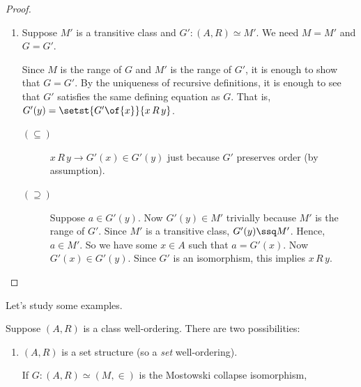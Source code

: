 \begin{proof}
\begin{enumerate}
\begin{itemize}
            \item \underline{Monotonicity.} Suppose $G(x) \in G(y)$. By definition of $G(y)$, there is some $x' \, R \, y$ such that $G(x) = G\of{x'}$. As $G$ is injective, we know that $x = x'$. Thus, $x \, R \, y$.
        \end{itemize}

        \item Suppose $M'$ is a transitive class and $G' : (A, R) \simeq M'$. We need $M = M'$ and $G = G'$.

        Since $M$ is the range of $G$ and $M'$ is the range of $G'$, it is enough to show that $G = G'$. By the uniqueness of recursive definitions, %
        it is enough to see that $G'$ satisfies the same defining equation as $G$. That is, $G'(y) = \setst{G'\of{x}}{x \, R \, y}$.

        \begin{description}
            \item[$(\subseteq)$]
                $x \, R \, y \to G'(x) \in G'(y)$ just because $G'$ preserves order (by assumption).

            \item[$(\supseteq)$]
                Suppose $a \in G'(y)$. Now $G'(y) \in M'$ trivially because $M'$ is the range of $G'$. Since $M'$ is a transitive class, $G'(y) \ssq M'$. Hence, $a \in M'$. So we have some $x \in A$ such that $a = G'(x)$. Now $G'(x) \in G'(y)$. Since $G'$ is an isomorphism, this implies $x \, R \, y$.
        \end{description}
    \end{enumerate}
\end{proof}

Let's study some examples.

Suppose $(A, R)$ is a class well-ordering. There are two possibilities:
\begin{enumerate}
    \item $(A, R)$ is a set structure (so a \textit{set} well-ordering).

    If $G : (A, R) \simeq (M, \in)$ is the Mostowski collapse isomorphism,
\end{enumerate}